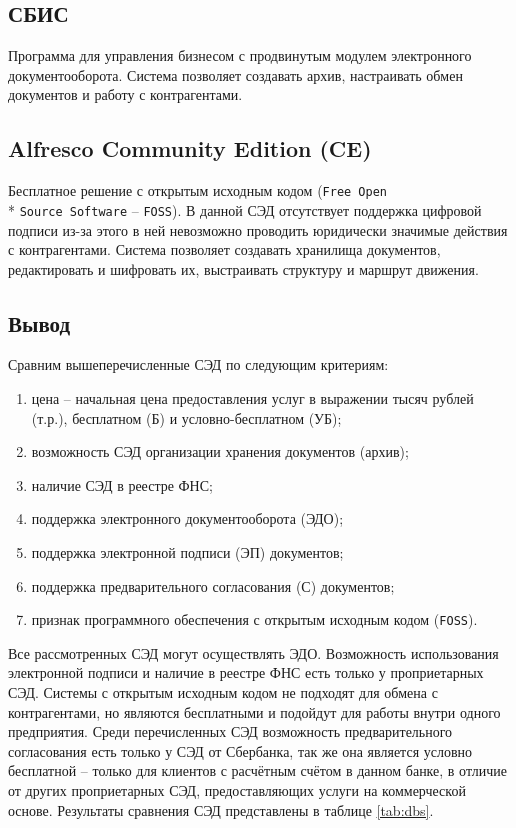 \subsection{СБИС}

Программа для управления бизнесом с продвинутым модулем электронного документооборота\cite{sbis}. Система позволяет создавать архив, настраивать обмен документов и работу с контрагентами.

\subsection{Alfresco Community Edition (CE)}

Бесплатное решение с открытым исходным кодом\cite{ace} (\texttt{Free Open} \\* \texttt{Source Software} -- \texttt{FOSS}). В данной СЭД отсутствует поддержка цифровой подписи из-за этого в ней невозможно проводить юридически значимые действия с контрагентами. Система позволяет создавать хранилища документов, редактировать и шифровать их, выстраивать структуру и маршрут движения.

\subsection{Вывод}

Сравним вышеперечисленные СЭД по следующим критериям:
\begin{enumerate}
	\item цена -- начальная цена предоставления услуг в выражении тысяч рублей (т.р.), бесплатном (Б) и условно-бесплатном (УБ);

	\item возможность СЭД организации хранения документов (архив);

	\item наличие СЭД в реестре ФНС;

	\item поддержка электронного документооборота (ЭДО);

	\item поддержка электронной подписи (ЭП) документов;

	\item поддержка предварительного согласования (С) документов;
	
	\item признак программного обеспечения с открытым исходным кодом (\texttt{FOSS}).
\end{enumerate}

 Все рассмотренных СЭД могут осуществлять ЭДО. Возможность использования электронной подписи и наличие в реестре ФНС есть только у проприетарных СЭД. Системы с открытым исходным кодом не подходят для обмена с контрагентами, но являются бесплатными и подойдут для работы внутри одного предприятия. Среди перечисленных СЭД возможность предварительного согласования есть только у СЭД от Сбербанка, так же она является условно бесплатной -- только для клиентов с расчётным счётом в данном банке, в отличие от других проприетарных СЭД, предоставляющих услуги на коммерческой основе. Результаты сравнения СЭД представлены в таблице \ref{tab:dbs}.

